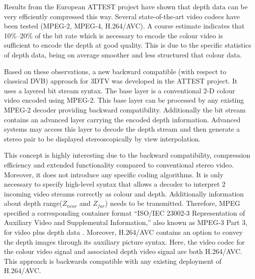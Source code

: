 Results from the European ATTEST project  have shown that depth data can be very efficiently compressed this way. Several state-of-the-art video codecs have been tested (MPEG-2, MPEG-4, H.264/AVC). A course estimate indicates that 10\%–20\% of the bit rate which is necessary to encode the colour video is sufficient to encode the depth at good quality. This is due to the specific statistics of depth data, being on average smoother and less structured that colour data.

Based on these observations, a new backward compatible (with respect to classical DVB) approach for 3DTV was developed in the ATTEST project. It uses a layered bit stream syntax. The base layer is a conventional 2-D colour video encoded using MPEG-2. This base layer can be processed by any existing MPEG-2 decoder providing backward compatibility. Additionally the bit stream contains an advanced layer carrying the encoded depth information. Advanced systems may access this layer to decode the depth stream and then generate a stereo pair to be displayed stereoscopically by view interpolation.

This concept is highly interesting due to the backward compatibility, compression efficiency and extended functionality compared to conventional stereo video. Moreover, it does not introduce any specific coding algorithms. It is only necessary to specify high-level syntax that allows a decoder to interpret 2 incoming video streams correctly as colour and depth. Additionally information about depth range($Z_{near}$ and $Z_{far}$) needs to be transmitted. Therefore, MPEG specified a corresponding container format “ISO/IEC 23002-3 Representation of Auxiliary Video and Supplemental Information,” also known as MPEG-3 Part 3, for video plus depth data . Moreover, H.264/AVC contains an option to convey the depth images through its auxiliary picture syntax. Here, the video codec for the colour video signal and associated depth video signal are both H.264/AVC. This approach is backwards compatible with any existing deployment of H.264/AVC.


